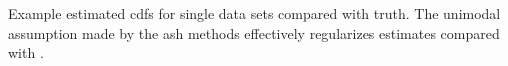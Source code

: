 \label{fig:egcdf} Example estimated cdfs for single data sets compared with truth. The unimodal assumption made by the ash methods effectively regularizes estimates compared with \mixfdr.